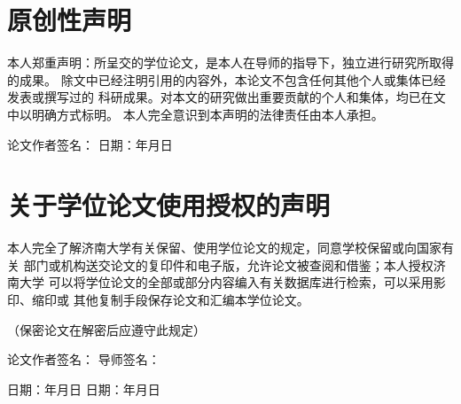 %

\chapter*{原创性声明}
\thispagestyle{plain}

本人郑重声明：所呈交的学位论文，是本人在导师的指导下，独立进行研究所取得的成果。
除文中已经注明引用的内容外，本论文不包含任何其他个人或集体已经发表或撰写过的
科研成果。对本文的研究做出重要贡献的个人和集体，均已在文中以明确方式标明。
本人完全意识到本声明的法律责任由本人承担。

\vspace{3cm}
\noindent\hfill 论文作者签名：\underline{\hspace{4cm}}\qquad
日\quad 期：\underline{\hspace{2cm}}年\underline{\hspace{1cm}}月\underline{\hspace{1cm}}日

\vspace{3cm}

\chapter*{关于学位论文使用授权的声明}
\thispagestyle{plain}

本人完全了解济南大学有关保留、使用学位论文的规定，同意学校保留或向国家有关
部门或机构送交论文的复印件和电子版，允许论文被查阅和借鉴；本人授权济南大学
可以将学位论文的全部或部分内容编入有关数据库进行检索，可以采用影印、缩印或
其他复制手段保存论文和汇编本学位论文。

\vspace{1cm}
（保密论文在解密后应遵守此规定）

\vspace{3cm}
\noindent 论文作者签名：\underline{\hspace{3.5cm}}\qquad
导师签名：\underline{\hspace{3.5cm}}

\vspace{1cm}
\noindent 日\quad 期：\underline{\hspace{2cm}}年\underline{\hspace{1cm}}月\underline{\hspace{1cm}}日\qquad
日\quad 期：\underline{\hspace{2cm}}年\underline{\hspace{1cm}}月\underline{\hspace{1cm}}日
